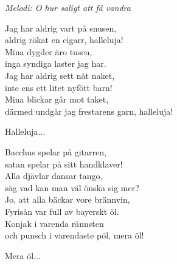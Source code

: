 {\footnotesize\textit{Melodi: O hur saligt att få vandra}}\par
\vspace{10pt}
Jag har aldrig vart på snusen,\\
aldrig rökat en cigarr, halleluja!\\
Mina dygder äro tusen,\\
inga syndiga laster jag har.\\
Jag har aldrig sett nåt naket,\\
inte ens ett litet nyfött barn!\\
Mina blickar går mot taket,\\
därmed undgår jag frestarens garn, halleluja!\par
\vspace{10pt}
Halleluja...\par
\vspace{10pt}
Bacchus spelar på gitarren,\\
satan spelar på sitt handklaver!\\
Alla djävlar dansar tango,\\
säg vad kan man väl önska sig mer?\\
Jo, att alla bäckar vore brännvin,\\
Fyrisån var full av bayerskt öl.\\
Konjak i varenda rännsten\\
och punsch i varendaste pöl, mera öl!\par
\vspace{10pt}
Mera öl...\par
\vspace{10pt}

